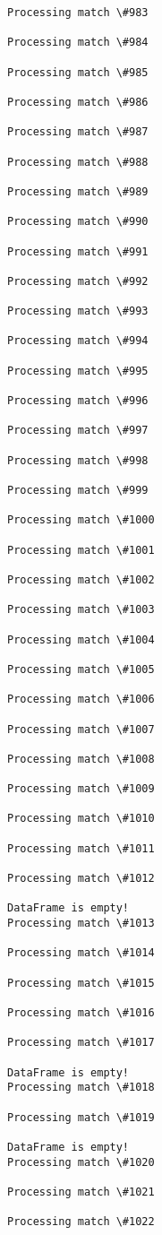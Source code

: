 \documentclass[11pt]{article}
\begin{document}
\begin{Verbatim}[commandchars=\\\{\}]
Processing match \#983

Processing match \#984

Processing match \#985

Processing match \#986

Processing match \#987

Processing match \#988

Processing match \#989

Processing match \#990

Processing match \#991

Processing match \#992

Processing match \#993

Processing match \#994

Processing match \#995

Processing match \#996

Processing match \#997

Processing match \#998

Processing match \#999

Processing match \#1000

Processing match \#1001

Processing match \#1002

Processing match \#1003

Processing match \#1004

Processing match \#1005

Processing match \#1006

Processing match \#1007

Processing match \#1008

Processing match \#1009

Processing match \#1010

Processing match \#1011

Processing match \#1012

DataFrame is empty!
Processing match \#1013

Processing match \#1014

Processing match \#1015

Processing match \#1016

Processing match \#1017

DataFrame is empty!
Processing match \#1018

Processing match \#1019

DataFrame is empty!
Processing match \#1020

Processing match \#1021

Processing match \#1022


\end{Verbatim}
\end{document}
